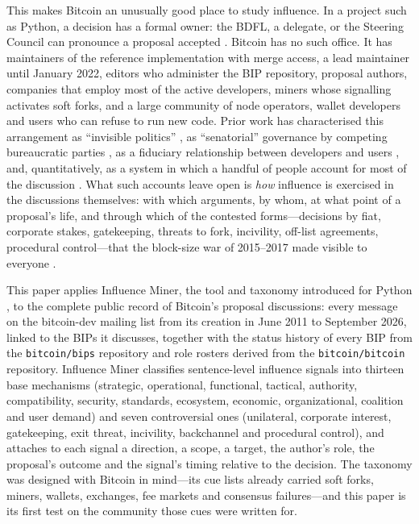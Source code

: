 \documentclass[sigconf,screen]{acmart}
\begin{document}
This makes Bitcoin an unusually good place to study influence. In a project such as Python, a decision has a formal owner: the BDFL, a delegate, or the Steering Council can pronounce a proposal accepted \cite{pep1, pep13}. Bitcoin has no such office. It has maintainers of the reference implementation with merge access, a lead maintainer until January 2022, editors who administer the BIP repository, proposal authors, companies that employ most of the active developers, miners whose signalling activates soft forks, and a large community of node operators, wallet developers and users who can refuse to run new code. Prior work has characterised this arrangement as ``invisible politics'' \cite{defilippi2016}, as ``senatorial'' governance by competing bureaucratic parties \cite{parkin2019}, as a fiduciary relationship between developers and users \cite{walch2019}, and, quantitatively, as a system in which a handful of people account for most of the discussion \cite{azouvi2018}. What such accounts leave open is \emph{how} influence is exercised in the discussions themselves: with which arguments, by whom, at what point of a proposal's life, and through which of the contested forms---decisions by fiat, corporate stakes, gatekeeping, threats to fork, incivility, off-list agreements, procedural control---that the block-size war of 2015--2017 made visible to everyone \cite{bier2021}.

This paper applies Influence Miner, the tool and taxonomy introduced for Python \cite{influenceMinerPython}, to the complete public record of Bitcoin's proposal discussions: every message on the bitcoin-dev mailing list from its creation in June 2011 to September 2026, linked to the BIPs it discusses, together with the status history of every BIP from the \texttt{bitcoin/bips} repository and role rosters derived from the \texttt{bitcoin/bitcoin} repository. Influence Miner classifies sentence-level influence signals into thirteen base mechanisms (strategic, operational, functional, tactical, authority, compatibility, security, standards, ecosystem, economic, organizational, coalition and user demand) and seven controversial ones (unilateral, corporate interest, gatekeeping, exit threat, incivility, backchannel and procedural control), and attaches to each signal a direction, a scope, a target, the author's role, the proposal's outcome and the signal's timing relative to the decision. The taxonomy was designed with Bitcoin in mind---its cue lists already carried soft forks, miners, wallets, exchanges, fee markets and consensus failures---and this paper is its first test on the community those cues were written for.
\end{document}
